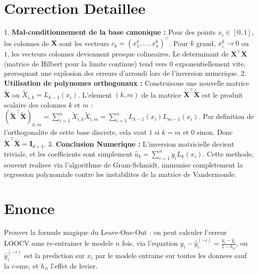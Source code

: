 \documentclass[11pt,a4paper]{report}
\begin{document}
\section{Correction Detaillee}
1. \textbf{Mal-conditionnement de la base canonique :}
   Pour des points $x_i \in [0, 1]$, les colonnes de $\mathbf{X}$ sont les vecteurs $c_k = (x_1^k, \dots, x_n^k)^\top$.
   Pour $k$ grand, $x_i^k \to 0$ ou $1$, les vecteurs colonnes deviennent presque colineaires. Le determinant de $\mathbf{X}^\top\mathbf{X}$ (matrice de Hilbert pour la limite continue) tend vers $0$ exponentiellement vite, provoquant une explosion des erreurs d'arrondi lors de l'inversion numerique.
2. \textbf{Utilisation de polynomes orthogonaux :}
   Construisons une nouvelle matrice $\mathbf{\tilde{X}}$ ou $\tilde{X}_{i,k} = L_{k-1}(x_i)$.
   L'element $(k, m)$ de la matrice $\mathbf{\tilde{X}}^\top\mathbf{\tilde{X}}$ est le produit scalaire des colonnes $k$ et $m$ :
   $(\mathbf{\tilde{X}}^\top\mathbf{\tilde{X}})_{k,m} = \sum_{i=1}^n \tilde{X}_{i,k} \tilde{X}_{i,m} = \sum_{i=1}^n L_{k-1}(x_i) L_{m-1}(x_i)$.
   Par definition de l'orthogonalite de cette base discrete, cela vaut $1$ si $k=m$ et $0$ sinon.
   Donc $\mathbf{\tilde{X}}^\top\mathbf{\tilde{X}} = \mathbf{I}_{d+1}$.
3. \textbf{Conclusion Numerique :}
   L'inversion matricielle devient triviale, et les coefficients sont simplement $\hat{a}_k = \sum_{i=1}^n y_i L_k(x_i)$. Cette methode, souvent realisee via l'algorithme de Gram-Schmidt, immunise completement la regression polynomiale contre les instabilites de la matrice de Vandermonde.

\section{Enonce}
Prouver la formule magique du Leave-One-Out : on peut calculer l'erreur LOOCV sans re-entrainer le modele $n$ fois, via l'equation $y_i - \hat{y}_{i}^{(-i)} = \frac{y_i - \hat{y}_i}{1 - h_{ii}}$, ou $\hat{y}_{i}^{(-i)}$ est la prediction sur $x_i$ par le modele entraine sur toutes les donnees sauf la $i$-eme, et $h_{ii}$ l'effet de levier.
\end{document}
